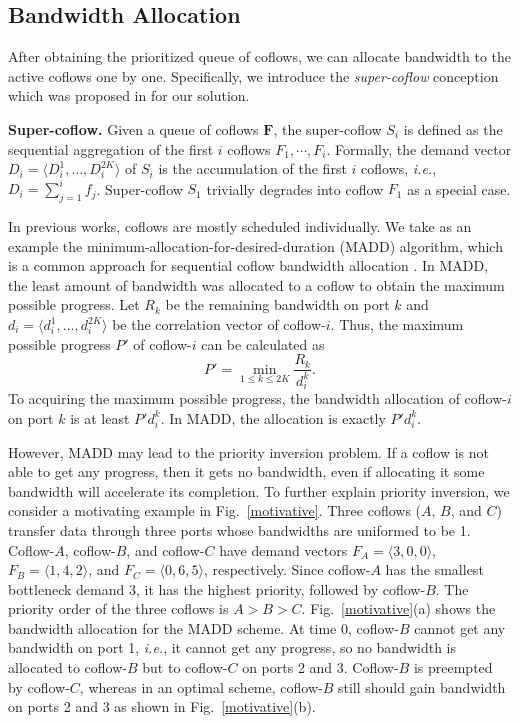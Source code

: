 \documentclass[10pt, conference, letterpaper]{IEEEtran}
\begin{document}
\subsection{Bandwidth Allocation}
After obtaining the prioritized queue of coflows, we can allocate bandwidth to the active coflows one by one. Specifically, we introduce the \emph{super-coflow} conception which was proposed in \cite{utopia} for our solution.

\noindent \textbf{Super-coflow.} Given a queue of coflows $\mathbf{F}$, the super-coflow $S_i$ is defined as the sequential aggregation of the first $i$ coflows $F_1,\cdots,F_i$. Formally, the demand vector $D_i = \langle D_i^1,\dots,D_i^{2K} \rangle$ of $S_i$ is the accumulation of the first $i$ coflows, \emph{i.e.}, $D_i = \sum_{j=1}^if_j$. Super-coflow $S_1$ trivially degrades into coflow $F_1$ as a special case.

In previous works, coflows are mostly scheduled individually. We take as an example the minimum-allocation-for-desired-duration (MADD) algorithm, which is a common approach for sequential coflow bandwidth allocation \cite{varys, orchestra}. In MADD, the least amount of bandwidth was allocated to a coflow to obtain the maximum possible progress. Let $R_k$ be the remaining bandwidth on port $k$ and $d_i=\langle d_i^1,\dots,d_i^{2K}\rangle$ be the correlation vector of coflow-$i$. Thus, the maximum possible progress $P'$ of coflow-$i$ can be calculated as
\begin{equation}
	P' = \min_{1\leq k \leq 2K}\frac{R_k}{d_i^k}.
\end{equation}
To acquiring the maximum possible progress, the bandwidth allocation of coflow-$i$ on port $k$ is at least $P'd_i^k$. In MADD, the allocation is exactly $P'd_i^k$.

However, MADD may lead to the priority inversion problem. If a coflow is not able to get any progress, then it gets no bandwidth, even if allocating it some bandwidth will accelerate its completion. To further explain priority inversion, we consider a motivating example in Fig.~\ref{motivative}. Three coflows ($A$, $B$, and $C$) transfer data through three ports whose bandwidths are uniformed to be 1. Coflow-$A$, coflow-$B$, and coflow-$C$ have demand vectors $F_A=\langle 3,0,0\rangle$, $F_B=\langle 1,4,2\rangle$, and $F_C=\langle 0,6,5\rangle$, respectively. Since coflow-$A$ has the smallest bottleneck demand 3, it has the highest priority, followed by coflow-$B$. The priority order of the three coflows is $A > B > C$. Fig.~\ref{motivative}(a) shows the bandwidth allocation for the MADD scheme. At time 0, coflow-$B$ cannot get any bandwidth on port 1, \emph{i.e.}, it cannot get any progress, so no bandwidth is allocated to coflow-$B$ but to coflow-$C$ on ports 2 and 3. Coflow-$B$ is preempted by coflow-$C$, whereas in an optimal scheme, coflow-$B$ still should gain bandwidth on ports 2 and 3 as shown in Fig.~\ref{motivative}(b).
\end{document}
